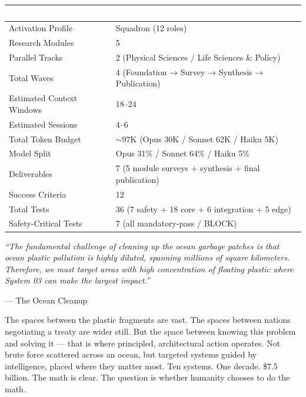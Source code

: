\documentclass[11pt,letterpaper]{article}
\newcommand{\tableheader}[1]{\textbf{\sffamily\textcolor{white}{#1}}}
\begin{document}
\begin{center}
\begin{tabularx}{\textwidth}{L{5cm}X}
\toprule
{}
\tableheader{Metric} & \tableheader{Value} \\
\midrule
Activation Profile & Squadron (12 roles) \\
Research Modules & 5 \\
Parallel Tracks & 2 (Physical Sciences / Life Sciences \& Policy) \\
Total Waves & 4 (Foundation → Survey → Synthesis → Publication) \\
Estimated Context Windows & 18--24 \\
Estimated Sessions & 4--6 \\
Total Token Budget & $\sim$97K (Opus 30K / Sonnet 62K / Haiku 5K) \\
Model Split & Opus 31\% / Sonnet 64\% / Haiku 5\% \\
Deliverables & 7 (5 module surveys + synthesis + final publication) \\
Success Criteria & 12 \\
Total Tests & 36 (7 safety + 18 core + 6 integration + 5 edge) \\
Safety-Critical Tests & 7 (all mandatory-pass / BLOCK) \\
\bottomrule
\end{tabularx}
\end{center}

\vspace{1em}

\begin{quotebox}
\textit{``The fundamental challenge of cleaning up the ocean garbage patches is that ocean plastic pollution is highly diluted, spanning millions of square kilometers. Therefore, we must target areas with high concentration of floating plastic where System 03 can make the largest impact.''}

\vspace{0.5em}

\hfill --- The Ocean Cleanup

\vspace{0.8em}

The spaces between the plastic fragments are vast. The spaces between nations negotiating a treaty are wider still. But the space between knowing this problem and solving it --- that is where principled, architectural action operates. Not brute force scattered across an ocean, but targeted systems guided by intelligence, placed where they matter most. Ten systems. One decade. \$7.5 billion. The math is clear. The question is whether humanity chooses to do the math.
\end{quotebox}
\end{document}
